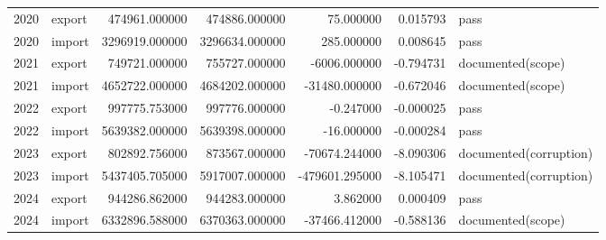 \begin{tabular}{rlrrrrl}
2020 & export & 474961.000000 & 474886.000000 & 75.000000 & 0.015793 & pass \\
2020 & import & 3296919.000000 & 3296634.000000 & 285.000000 & 0.008645 & pass \\
2021 & export & 749721.000000 & 755727.000000 & -6006.000000 & -0.794731 & documented(scope) \\
2021 & import & 4652722.000000 & 4684202.000000 & -31480.000000 & -0.672046 & documented(scope) \\
2022 & export & 997775.753000 & 997776.000000 & -0.247000 & -0.000025 & pass \\
2022 & import & 5639382.000000 & 5639398.000000 & -16.000000 & -0.000284 & pass \\
2023 & export & 802892.756000 & 873567.000000 & -70674.244000 & -8.090306 & documented(corruption) \\
2023 & import & 5437405.705000 & 5917007.000000 & -479601.295000 & -8.105471 & documented(corruption) \\
2024 & export & 944286.862000 & 944283.000000 & 3.862000 & 0.000409 & pass \\
2024 & import & 6332896.588000 & 6370363.000000 & -37466.412000 & -0.588136 & documented(scope) \\
\bottomrule
\end{tabular}
